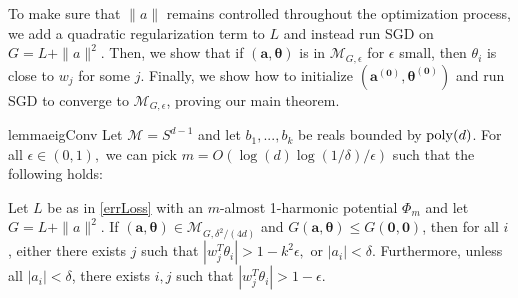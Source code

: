 To make sure that $\|a\|$ remains controlled throughout the optimization process, we add a quadratic regularization term to $L$ and instead run SGD on $G = L + \|a\|^2$. Then, we show that if $(\boldsymbol{a,\theta})$ is in $\mathcal{M}_{G, \epsilon}$ for $\epsilon$ small, then $\theta_i$ is close to $w_j$ for some $j$. Finally, we show how to initialize $(\boldsymbol{a^{(0)},\theta^{(0)}})$ and run SGD to converge to $\mathcal{M}_{G,\epsilon}$, proving our main theorem.
%
%
\begin{restatable}{lemma}{eigConv}
\label{eigConv}
Let $\mathcal{M} = S^{d-1}$ and let $b_1,...,b_k$ be reals bounded by
$\mathrm{poly}(d)$. For all $\epsilon \in (0,1),$ we can pick
$m = O(\log(d)\log(1/\delta)/\epsilon)$ such that the following holds:

Let $L$ be as in \eqref{errLoss} with an $m$-almost 1-harmonic
potential $\Phi_m$ and let $G = L + \|a\|^2$.  If
$(\boldsymbol{a,\theta}) \in \mathcal{M}_{G, \delta^2 / (4d)}$ and
$G(\boldsymbol{a,\theta}) \leq G(\boldsymbol{0, 0})$, then for all
$i$, either there exists $j$ such that
$|w_j^T\theta_i| > 1- k^2\epsilon,$ or $|a_i| < \delta$. Furthermore, unless all $|a_i| <\delta$,  there exists $i, j$ such that $|w_j^T\theta_i| > 1-\epsilon$.
\end{restatable}
%
